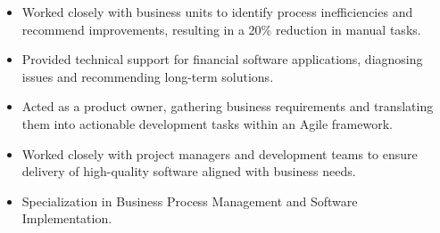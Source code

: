 \par\smallskip
\noindent
\begin{minipage}{20cm}
  \begin{minipage}{9.75cm}
    \begin{itemize}
      \item Worked closely with business units to identify process inefficiencies and recommend improvements, resulting in a 20\% reduction in manual tasks.
      \item Provided technical support for financial software applications, diagnosing issues and recommending long-term solutions.
    \end{itemize}
  \end{minipage}
  \hfill
  \begin{minipage}{9.75cm}
    \begin{itemize}
      \item Acted as a product owner, gathering business requirements and translating them into actionable development tasks within an Agile framework.
      \item Worked closely with project managers and development teams to ensure delivery of high-quality software aligned with business needs.
    \end{itemize}
  \end{minipage}
\end{minipage}

\begin{itemize}
  \item Specialization in Business Process Management and Software Implementation.
\end{itemize}


\noindent
\begin{minipage}{20cm}
\end{minipage}


